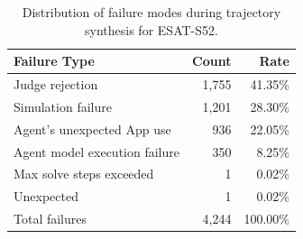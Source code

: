 \begin{table}[t]
\centering
\small
\begin{tabular}{lrr}
\toprule
\textbf{Failure Type} & \textbf{Count} & \textbf{Rate} \\
\midrule
Judge rejection & 1,755 & 41.35\% \\
Simulation failure &  1,201 & 28.30\% \\
Agent's unexpected App use & 936 & 22.05\% \\
Agent model execution failure & 350 & 8.25\% \\
Max solve steps exceeded & 1 & 0.02\% \\
Unexpected & 1 & 0.02\% \\
\midrule
Total failures & 4,244 & 100.00\% \\
\bottomrule
\end{tabular}
\caption{Distribution of failure modes during trajectory synthesis for \textsc{ESAT}-S52.}
\label{tab:syn_failure_distribution}
\end{table}
